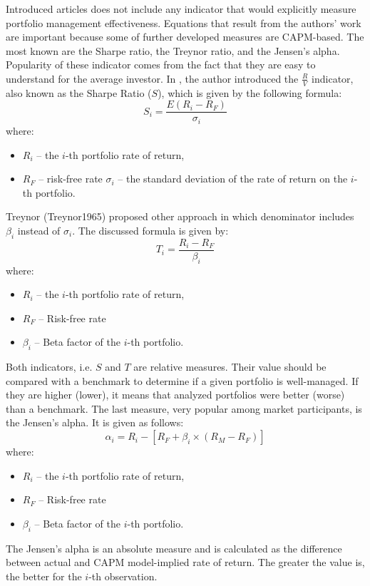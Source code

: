 \documentclass{pracamgr_wne}\usepackage[]{graphicx}\usepackage[]{color}
\begin{document}
Introduced articles does not include any indicator that would explicitly measure portfolio management effectiveness. 
Equations that result from the authors' work are important because some of further developed measures are CAPM-based. 
The most known are the Sharpe ratio, the Treynor ratio, and the Jensen's alpha. Popularity of these indicator comes from the fact that 
they are easy to understand for the average investor. \parencite{Marte2012}
In \parencite{Sharpe1966}, the author introduced the $\frac{R}{V}$ indicator, also known as the Sharpe Ratio ($S$), which is given by the following formula:
\begin{equation}
S_i=\frac{E(R_i-R_F)}{\sigma_i}
\end{equation}
where: 
\begin{itemize}
\item $R_i$ -- the $i$-th portfolio rate of return,
\item $R_F$ -- risk-free rate
$\sigma_i$ -- the standard deviation of the rate of return on the $i$-th portfolio.
\end{itemize}
Treynor (Treynor1965) proposed other approach in which denominator includes $\beta_i$ instead of $\sigma_i$. The discussed formula is given by:
\begin{equation}
T_i=\frac{R_i-R_F}{\beta_i}
\end{equation}
where:
\begin{itemize}
\item $R_i$ -- the $i$-th portfolio rate of return,
\item $R_F$ -- Risk-free rate
\item $\beta_i$ -- Beta factor of the $i$-th portfolio.
\end{itemize}
Both indicators, i.e. $S$ and $T$ are relative measures. Their value should be compared with a benchmark to determine if a given portfolio is well-managed. If they are
higher (lower), it means that analyzed portfolios were better (worse) than a benchmark.
The last measure, very popular among market participants, is the Jensen's alpha. It is given as follows:
\begin{equation}
\alpha_i=R_i-[R_F+\beta_i\times(R_M-R_F )]
\end{equation}
where:
\begin{itemize}
\item $R_i$ -- the $i$-th portfolio rate of return,
\item $R_F$ -- Risk-free rate
\item $\beta_i$ -- Beta factor of the $i$-th portfolio.
\end{itemize}
The Jensen's alpha is an absolute measure and is calculated as the difference between actual and CAPM model-implied rate of return. The greater the value is,
the better for the $i$-th observation.
\end{document}

